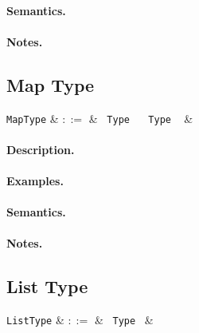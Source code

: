 \paragraph{Semantics.}

\paragraph{Notes.} 


\subsection{Map Type}

\begin{syntax}
  \verb+MapType+ & $::=$ & \token{\{} \ \verb+Type+ \ \token{=>} \ \verb+Type+ \ \token{\}} &\\
\end{syntax}

\paragraph{Description.}

\paragraph{Examples.}

\paragraph{Semantics.}

\paragraph{Notes.} 


\subsection{List Type}

\begin{syntax}
  \verb+ListType+ & $::=$ & \token{[} \ \verb+Type+ \ \token{]}&\\
\end{syntax}

